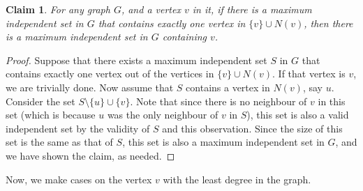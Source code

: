 \documentclass[answers]{exam}
\newtheorem{claim}{Claim}
\begin{document}
\begin{questions}
\begin{solution}
    \begin{claim}
        For any graph $G$, and a vertex $v$ in it, if there is a maximum independent set in $G$ that contains exactly one vertex in $\{v\} \cup N(v)$, then there is a maximum independent set in
        $G$ containing $v$.
    \end{claim}

    \begin{proof}
        Suppose that there exists a maximum independent set $S$ in $G$ that contains exactly one vertex out of the vertices in $\{v\} \cup N(v)$. If that vertex is $v$, we are trivially done. Now
        assume that $S$ contains a vertex in $N(v)$, say $u$. Consider the set $S \setminus \{u\} \cup \{v\}$. Note that since there is no neighbour of $v$ in this set (which is because $u$ was the
        only neighbour of $v$ in $S$), this set is also a valid independent set by the validity of $S$ and this observation. Since the size of this set is the same as that of $S$, this set is also a
        maximum independent set in $G$, and we have shown the claim, as needed.
    \end{proof}

Now, we make cases on the vertex $v$ with the least degree in the graph.


\end{solution}
\end{questions}
\end{document}
